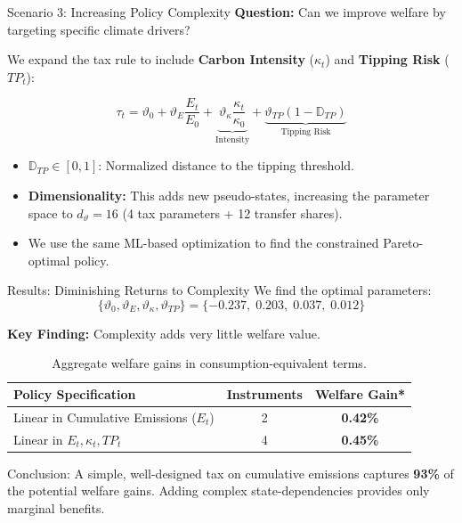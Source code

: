 \documentclass[aspectratio=1610]{beamer}
\begin{document}
\begin{frame}{Scenario 3: Increasing Policy Complexity}
    \textbf{Question:} Can we improve welfare by targeting specific climate drivers?
    \vspace{0.5em}
    
    We expand the tax rule to include \textbf{Carbon Intensity} ($\kappa_t$) and \textbf{Tipping Risk} ($TP_t$):
    
    \begin{equation}
        \label{eq:tax_fun_lin_S_kappa_tipping}
        \tau_t = \vartheta_0 + \vartheta_E \frac{E_t}{E_0} + \underbrace{\vartheta_\kappa \frac{\kappa_t}{\kappa_0}}_{\text{Intensity}} + \underbrace{\vartheta_{TP} (1 - \mathbb{D}_{TP})}_{\text{Tipping Risk}}
    \end{equation}
    
    \begin{itemize}
        \item $\mathbb{D}_{TP} \in [0,1]$: Normalized distance to the tipping threshold.
        \item \textbf{Dimensionality:} This adds new pseudo-states, increasing the parameter space to $d_\vartheta = 16$ (4 tax parameters + 12 transfer shares).
        \item We use the same ML-based optimization to find the constrained Pareto-optimal policy.
    \end{itemize}
\end{frame}
\begin{frame}{Results: Diminishing Returns to Complexity}
    We find the optimal parameters:
    \[
        \{\vartheta_0, \vartheta_E, \vartheta_\kappa, \vartheta_{TP} \} = \{-0.237,\;  0.203, \;  0.037, \;  0.012 \}
    \]
    
    \textbf{Key Finding:} Complexity adds very little welfare value.
    
    \begin{table}[h]
        \centering
        \begin{tabular}{lcc}
            \toprule
            \textbf{Policy Specification} & \textbf{Instruments} & \textbf{Welfare Gain*} \\
            \midrule
            Linear in Cumulative Emissions ($E_t$) & 2 & \textbf{0.42\%} \\
            Linear in $E_t, \kappa_t, TP_t$ & 4 & \textbf{0.45\%} \\
            \bottomrule
        \end{tabular}
        \caption{\footnotesize Aggregate welfare gains in consumption-equivalent terms.}
    \end{table}
    
    \begin{alertblock}{Conclusion:}
        A simple, well-designed tax on cumulative emissions captures \textbf{93\%} of the potential welfare gains. Adding complex state-dependencies provides only marginal benefits.
    \end{alertblock}
\end{frame}
\end{document}
